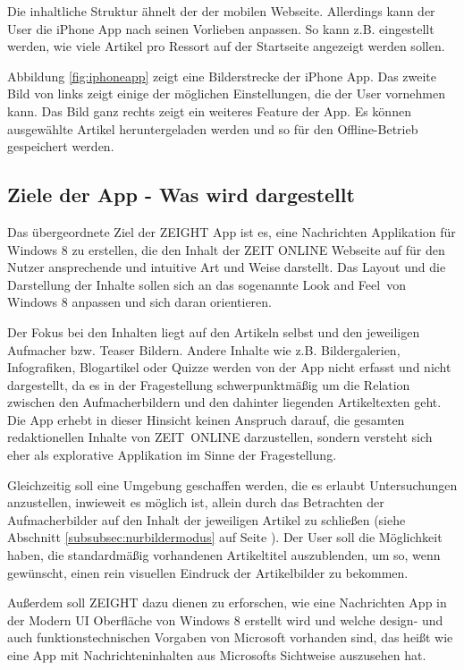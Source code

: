 \documentclass[12pt,a4paper,bibtotoc,abstracton]{scrartcl}
\begin{document}
Die inhaltliche Struktur ähnelt der der mobilen Webseite. Allerdings kann der User die iPhone App nach seinen Vorlieben anpassen. So kann z.B. eingestellt werden, wie viele Artikel pro Ressort auf der Startseite angezeigt werden sollen.

Abbildung \ref{fig:iphoneapp} zeigt eine Bilderstrecke der iPhone App. Das zweite Bild von links zeigt einige der möglichen Einstellungen, die der User vornehmen kann. Das Bild ganz rechts zeigt ein weiteres Feature der App. Es können ausgewählte Artikel heruntergeladen werden und so für den Offline-Betrieb gespeichert werden.

\subsection{Ziele der App - Was wird dargestellt}
\label{subsec:zielderapp}
Das übergeordnete Ziel der ZEIGHT App ist es, eine Nachrichten Applikation für Windows 8 zu erstellen, die den Inhalt der ZEIT ONLINE Webseite auf für den Nutzer ansprechende und intuitive Art und Weise darstellt. Das Layout und die Darstellung der Inhalte sollen sich an das sogenannte \glqq Look and Feel\grqq\ von Windows 8 anpassen und sich daran orientieren.

Der Fokus bei den Inhalten liegt auf den Artikeln selbst und den jeweiligen Aufmacher bzw. Teaser Bildern. Andere Inhalte wie z.B. Bildergalerien, Infografiken, Blogartikel oder Quizze werden von der App nicht erfasst und nicht dargestellt, da es in der Fragestellung schwerpunktmäßig um die Relation zwischen den Aufmacherbildern und den dahinter liegenden Artikeltexten geht. Die App erhebt in dieser Hinsicht keinen Anspruch darauf, die gesamten redaktionellen Inhalte von \mbox{ZEIT ONLINE} darzustellen, sondern versteht sich eher als explorative Applikation im Sinne der Fragestellung.

Gleichzeitig soll eine Umgebung geschaffen werden, die es erlaubt Untersuchungen anzustellen, inwieweit es möglich ist, allein durch das Betrachten der Aufmacherbilder auf den Inhalt der jeweiligen Artikel zu schließen (siehe Abschnitt \ref{subsubsec:nurbildermodus} auf Seite \pageref{subsubsec:nurbildermodus}). Der User soll die Möglichkeit haben, die standardmäßig vorhandenen Artikeltitel auszublenden, um so, wenn gewünscht, einen rein visuellen Eindruck der Artikelbilder zu bekommen.

Außerdem soll ZEIGHT dazu dienen zu erforschen, wie eine Nachrichten App in der Modern UI Oberfläche von Windows 8 erstellt wird und welche design- und auch funktionstechnischen Vorgaben von Microsoft vorhanden sind, das heißt wie eine App mit Nachrichteninhalten aus Microsofts Sichtweise auszusehen hat.
\end{document}
